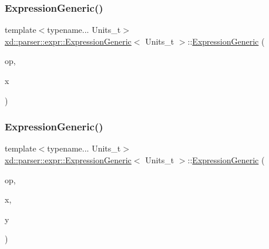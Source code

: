 \subsubsection{\texorpdfstring{Expression\+Generic()}{ExpressionGeneric()}\hspace{0.1cm}{\footnotesize\ttfamily [2/3]}}
{\footnotesize\ttfamily template$<$typename... Units\+\_\+t$>$ \\
\mbox{\hyperlink{structxd_1_1parser_1_1expr_1_1_expression_generic}{xd\+::parser\+::expr\+::\+Expression\+Generic}}$<$ Units\+\_\+t $>$\+::\mbox{\hyperlink{structxd_1_1parser_1_1expr_1_1_expression_generic}{Expression\+Generic}} (\begin{DoxyParamCaption}\item[{\mbox{\hyperlink{namespacexd_1_1parser_1_1expr_1_1op_ac61563bdf571a06b442d1fe819ff75bd}{op\+::\+Unary\+Operator}}}]{op,  }\item[{\mbox{\hyperlink{structxd_1_1parser_1_1expr_1_1_expression_generic}{Expression\+Generic}}$<$ Units\+\_\+t $>$}]{x }\end{DoxyParamCaption})\hspace{0.3cm}{\ttfamily [inline]}}

\mbox{\label{structxd_1_1parser_1_1expr_1_1_expression_generic_a7ebc687019b453f807bd542d5218ae31}} 
\subsubsection{\texorpdfstring{Expression\+Generic()}{ExpressionGeneric()}\hspace{0.1cm}{\footnotesize\ttfamily [3/3]}}
{\footnotesize\ttfamily template$<$typename... Units\+\_\+t$>$ \\
\mbox{\hyperlink{structxd_1_1parser_1_1expr_1_1_expression_generic}{xd\+::parser\+::expr\+::\+Expression\+Generic}}$<$ Units\+\_\+t $>$\+::\mbox{\hyperlink{structxd_1_1parser_1_1expr_1_1_expression_generic}{Expression\+Generic}} (\begin{DoxyParamCaption}\item[{\mbox{\hyperlink{namespacexd_1_1parser_1_1expr_1_1op_a5d85beecf0ae4a43576fdeacb264886a}{op\+::\+Binary\+Operator}}}]{op,  }\item[{\mbox{\hyperlink{structxd_1_1parser_1_1expr_1_1_expression_generic}{Expression\+Generic}}$<$ Units\+\_\+t $>$}]{x,  }\item[{\mbox{\hyperlink{structxd_1_1parser_1_1expr_1_1_expression_generic}{Expression\+Generic}}$<$ Units\+\_\+t $>$}]{y }\end{DoxyParamCaption})\hspace{0.3cm}{\ttfamily [inline]}}



